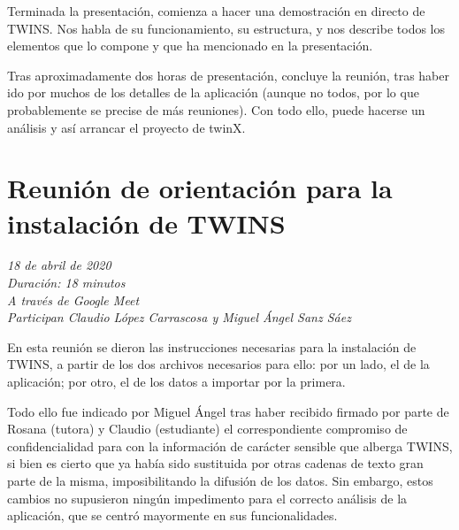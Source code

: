 \begin{appendices}
	Terminada la presentación, comienza a hacer una demostración en directo de TWINS. Nos habla de su funcionamiento, su estructura, y nos describe todos los elementos que lo compone y que ha mencionado en la presentación.
	
	Tras aproximadamente dos horas de presentación, concluye la reunión, tras haber ido por muchos de los detalles de la aplicación (aunque no todos, por lo que probablemente se precise de más reuniones). Con todo ello, puede hacerse un análisis y así arrancar el proyecto de twinX.
		
	\section*{Reunión de orientación para la instalación de TWINS}
	\label{reunion4}
	
	\textit{18 de abril de 2020}\\
	
	\textit{Duración: 18 minutos}\\
	
	\textit{A través de Google Meet}\\
	
	\textit{Participan Claudio López Carrascosa y Miguel Ángel Sanz Sáez}
	
	En esta reunión se dieron las instrucciones necesarias para la instalación de TWINS, a partir de los dos archivos necesarios para ello: por un lado, el de la aplicación; por otro, el de los datos a importar por la primera.
	
	Todo ello fue indicado por Miguel Ángel tras haber recibido firmado por parte de Rosana (tutora) y Claudio (estudiante) el correspondiente compromiso de confidencialidad para con la información de carácter sensible que alberga TWINS, si bien es cierto que ya había sido sustituida por otras cadenas de texto gran parte de la misma, imposibilitando la difusión de los datos. Sin embargo, estos cambios no supusieron ningún impedimento para el correcto análisis de la aplicación, que se centró mayormente en sus funcionalidades.
		
\end{appendices}
